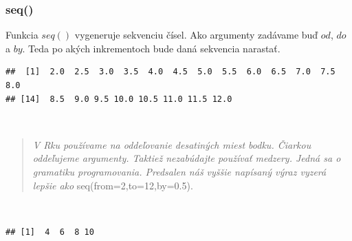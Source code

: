 \hypertarget{seq}{%
\subsubsection{seq()}\label{seq}}

Funkcia \(seq()\) vygeneruje sekvenciu čísel. Ako argumenty zadávame buď
\(od\), \(do\) a \(by\). Teda po akých inkrementoch bude daná sekvencia
narastať.

\begin{Shaded}
\begin{Highlighting}[]
\NormalTok{(} \NormalTok{, } \NormalTok{, } \NormalTok{)}
\end{Highlighting}
\end{Shaded}

\begin{verbatim}
##  [1]  2.0  2.5  3.0  3.5  4.0  4.5  5.0  5.5  6.0  6.5  7.0  7.5  8.0
## [14]  8.5  9.0 9.5 10.0 10.5 11.0 11.5 12.0
\end{verbatim}

~

\begin{quote}
\emph{V Rku používame na oddeľovanie desatiných miest bodku. Čiarkou
oddeľujeme argumenty. Taktiež nezabúdajte používať medzery. Jedná sa o
gramatiku programovania. Predsalen náš vyššie napísaný výraz vyzerá
lepšie ako} seq(from=2,to=12,by=0.5).
\end{quote}

~

\begin{Shaded}
\begin{Highlighting}[]

\NormalTok{(} \NormalTok{, } \NormalTok{, } \NormalTok{) }
\end{Highlighting}
\end{Shaded}

\begin{verbatim}
## [1]  4  6  8 10
\end{verbatim}

\begin{Shaded}
\begin{Highlighting}[]
\NormalTok{(} \NormalTok{, } \NormalTok{, } \NormalTok{)}
\end{Highlighting}
\end{Shaded}

